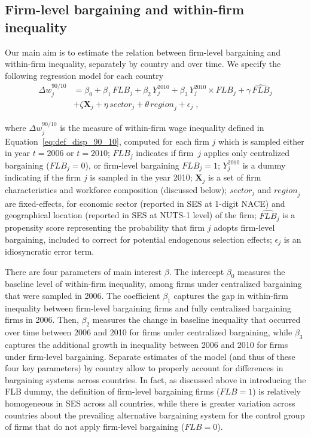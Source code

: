 \documentclass[Review,times,sageh,11pt]{sagej}
\begin{document}
\subsection{Firm-level bargaining and within-firm inequality}
Our main aim is to estimate the relation between firm-level bargaining and within-firm inequality, separately by country and over time. We specify the following regression model for each country
\begin{equation}
\label{eq:reg_dispersion}
\begin{split}
  \Delta w^{90/10}_j &= \beta_0 + \beta_1\, \mathit{FLB}_j + \beta_2\, \mathit{Y}^{2010}_j + \beta_3\, \mathit{Y}^{2010}_j \times \mathit{FLB}_j + \gamma\, \widehat{\mathit{FLB}}_j \\
                     &+ \zeta\mathbf{X}_j + \eta\, \mathit{sector}_j + \theta\, \mathit{region}_j + \epsilon_j \;,
\end{split}
\end{equation}

\noindent where $\Delta w_j^{90/10}$ is the measure of within-firm wage inequality defined in Equation~\eqref{eq:def_disp_90_10}, computed for each firm $j$ which is sampled either in year $t=2006$ or $t=2010$;
$\mathit{FLB}_j$ indicates if firm~$j$ applies only centralized bargaining ($\mathit{FLB}_j=0$), or firm-level bargaining $\mathit{FLB}_j=1$;
$\mathit{Y}^{2010}_j$ is a dummy indicating if the firm $j$ is sampled in the year 2010; $\mathbf{X}_j$ is a set of firm characteristics and workforce composition (discussed below); $\mathit{sector}_j$ and $\mathit{region}_j$ are fixed-effects, for economic sector (reported in SES at 1-digit NACE) and geographical location (reported in SES at NUTS-1 level) of the firm; $\widehat{\mathit{FLB}}_j$ is a propensity score representing the probability that firm $j$ adopts firm-level bargaining, included to correct for potential endogenous selection effects; $\epsilon_j$ is an idiosyncratic error term. 

There are four parameters of main interest $\beta$. The intercept $\beta_0$ measures the baseline level of within-firm inequality, among firms under centralized bargaining that were sampled in 2006. The coefficient $\beta_1$ captures the gap in within-firm inequality between firm-level bargaining firms and fully centralized bargaining firms in 2006. Then, $\beta_2$ measures the change in baseline inequality that occurred over time between 2006 and 2010 for firms under centralized bargaining, while $\beta_3$ captures the additional growth in inequality between 2006 and 2010 for firms under firm-level bargaining. Separate estimates of the model (and thus of these four key parameters) by country allow to properly account for differences in bargaining systems across countries. In fact, as discussed above in introducing the FLB dummy, the definition of firm-level bargaining firms ($\mathit{FLB}=1$) is relatively homogeneous in SES across all countries, while there is greater variation across countries about the prevailing alternative bargaining system for the control group of firms that do not apply firm-level bargaining ($\mathit{FLB}=0$).
\end{document}
